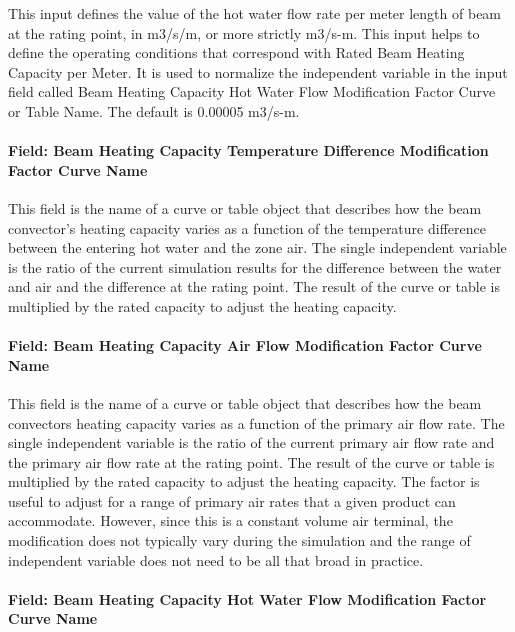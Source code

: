 This input defines the value of the hot water flow rate per meter length of beam at the rating point, in m3/s/m, or more strictly m3/s-m. This input helps to define the operating conditions that correspond with Rated Beam Heating Capacity per Meter. It is used to normalize the independent variable in the input field called Beam Heating Capacity Hot Water Flow Modification Factor Curve or Table Name. The default is 0.00005 m3/s-m.

\paragraph{Field: Beam Heating Capacity Temperature Difference Modification Factor Curve Name}\label{field-beam-heating-capacity-temperature-difference-modification-factor-curve-name}

This field is the name of a curve or table object that describes how the beam convector's heating capacity varies as a function of the temperature difference between the entering hot water and the zone air. The single independent variable is the ratio of the current simulation results for the difference between the water and air and the difference at the rating point. The result of the curve or table is multiplied by the rated capacity to adjust the heating capacity.

\paragraph{Field: Beam Heating Capacity Air Flow Modification Factor Curve Name}\label{field-beam-heating-capacity-air-flow-modification-factor-curve-name}

This field is the name of a curve or table object that describes how the beam convectors heating capacity varies as a function of the primary air flow rate. The single independent variable is the ratio of the current primary air flow rate and the primary air flow rate at the rating point. The result of the curve or table is multiplied by the rated capacity to adjust the heating capacity. The factor is useful to adjust for a range of primary air rates that a given product can accommodate. However, since this is a constant volume air terminal, the modification does not typically vary during the simulation and the range of independent variable does not need to be all that broad in practice.

\paragraph{Field: Beam Heating Capacity Hot Water Flow Modification Factor Curve Name}\label{field-beam-heating-capacity-hot-water-flow-modification-factor-curve-name}

